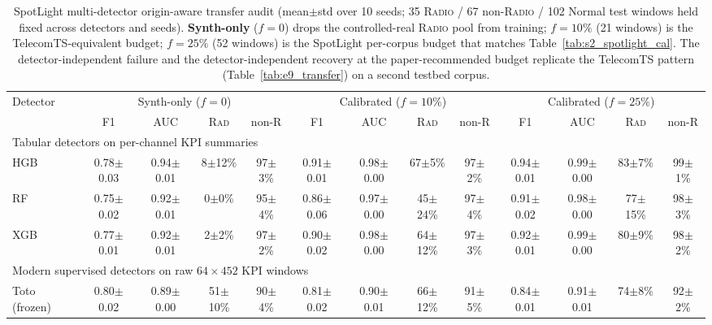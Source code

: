 \begin{table}[t]
  \caption{SpotLight multi-detector origin-aware transfer audit (mean$\pm$std over 10 seeds; 35 \textsc{Radio} / 67 non-\textsc{Radio} / 102 Normal test windows held fixed across detectors and seeds). \textbf{Synth-only} ($f\!=\!0$) drops the controlled-real \textsc{Radio} pool from training; $f\!=\!10\%$ (21 windows) is the TelecomTS-equivalent budget; $f\!=\!25\%$ (52 windows) is the SpotLight per-corpus budget that matches Table~\ref{tab:s2_spotlight_cal}. The detector-independent failure and the detector-independent recovery at the paper-recommended budget replicate the TelecomTS pattern (Table~\ref{tab:e9_transfer}) on a second testbed corpus.}
  \label{tab:s3_spotlight_transfer}
  \footnotesize
  \setlength{\tabcolsep}{2pt}
  \begin{tabular*}{\textwidth}{@{\extracolsep{\fill}}lcccccccccccc@{}}
    \toprule
    Detector & \multicolumn{4}{c}{Synth-only ($f\!=\!0$)} & \multicolumn{4}{c}{Calibrated ($f\!=\!10\%$)} & \multicolumn{4}{c}{Calibrated ($f\!=\!25\%$)} \\
    \cmidrule(lr){2-5}\cmidrule(lr){6-9}\cmidrule(lr){10-13}
      & F1 & AUC & \textsc{Rad} & non-\textsc{R} & F1 & AUC & \textsc{Rad} & non-\textsc{R} & F1 & AUC & \textsc{Rad} & non-\textsc{R} \\
    \midrule
    \multicolumn{13}{l}{Tabular detectors on per-channel KPI summaries} \\
    HGB & 0.78{\tiny$\pm$0.03} & 0.94{\tiny$\pm$0.01} & 8{\tiny$\pm$12}\% & 97{\tiny$\pm$3}\% & 0.91{\tiny$\pm$0.01} & 0.98{\tiny$\pm$0.00} & 67{\tiny$\pm$5}\% & 97{\tiny$\pm$2}\% & 0.94{\tiny$\pm$0.01} & 0.99{\tiny$\pm$0.00} & 83{\tiny$\pm$7}\% & 99{\tiny$\pm$1}\% \\
    RF & 0.75{\tiny$\pm$0.02} & 0.92{\tiny$\pm$0.01} & 0{\tiny$\pm$0}\% & 95{\tiny$\pm$4}\% & 0.86{\tiny$\pm$0.06} & 0.97{\tiny$\pm$0.00} & 45{\tiny$\pm$24}\% & 97{\tiny$\pm$4}\% & 0.91{\tiny$\pm$0.02} & 0.98{\tiny$\pm$0.00} & 77{\tiny$\pm$15}\% & 98{\tiny$\pm$3}\% \\
    XGB & 0.77{\tiny$\pm$0.01} & 0.92{\tiny$\pm$0.01} & 2{\tiny$\pm$2}\% & 97{\tiny$\pm$2}\% & 0.90{\tiny$\pm$0.02} & 0.98{\tiny$\pm$0.00} & 64{\tiny$\pm$12}\% & 97{\tiny$\pm$3}\% & 0.92{\tiny$\pm$0.01} & 0.99{\tiny$\pm$0.00} & 80{\tiny$\pm$9}\% & 98{\tiny$\pm$2}\% \\
    \midrule
    \multicolumn{13}{l}{Modern supervised detectors on raw $64\times452$ KPI windows} \\
    Toto (frozen) & 0.80{\tiny$\pm$0.02} & 0.89{\tiny$\pm$0.00} & 51{\tiny$\pm$10}\% & 90{\tiny$\pm$4}\% & 0.81{\tiny$\pm$0.02} & 0.90{\tiny$\pm$0.01} & 66{\tiny$\pm$12}\% & 91{\tiny$\pm$5}\% & 0.84{\tiny$\pm$0.01} & 0.91{\tiny$\pm$0.01} & 74{\tiny$\pm$8}\% & 92{\tiny$\pm$2}\% \\

\end{tabular*}
\end{table}
